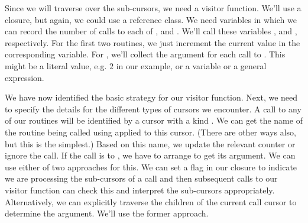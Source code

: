 Since we will traverse over the sub-cursors, we need a visitor
function. We'll use a closure, but again, we could use a reference
class.  We need variables in which we can record the number of calls
to each of ,  and
.  We'll call these variables ,
 and , respectively.
For the first two routines, we just increment the current value
in the corresponding \R{} variable.
For , we'll collect the argument for each call to
. This might be a literal value, e.g. $2$ in our
example, or a variable or a general expression.

We have now identified the basic strategy for our visitor function.
Next, we need to specify the details for the different types of
cursors we encounter. A call to any of our routines will be identified
by a cursor with a kind .  We can get the name
of the routine being called using  applied to this
cursor. (There are other ways also, but this is the simplest.)  Based
on this name, we update the relevant counter or ignore the call.  If
the call is to , we have to arrange to get its
argument.  We can use either of two approaches for this.  We can set a
flag in our closure to indicate we are processing the sub-cursors of a
 call and then subsequent calls to our visitor
function can check this and interpret the sub-cursors
appropriately. Alternatively, we can explicitly traverse the children
of the current call cursor to determine the argument.
We'll use the former approach.

